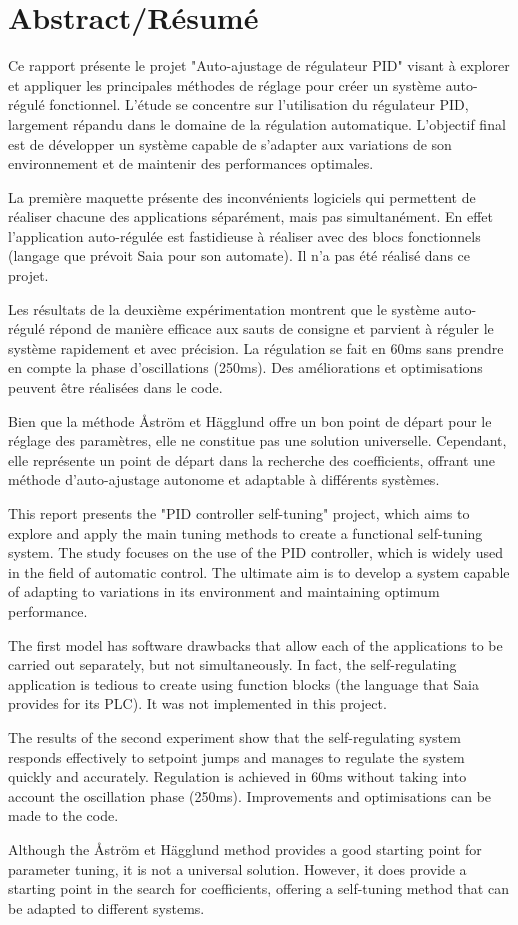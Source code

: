\part*{Abstract/Résumé}


Ce rapport présente le projet "Auto-ajustage de régulateur PID" visant à explorer et appliquer les principales méthodes de réglage pour créer un système auto-régulé fonctionnel. L'étude se concentre sur l'utilisation du régulateur PID, largement répandu dans le domaine de la régulation automatique. L'objectif final est de développer un système capable de s'adapter aux variations de son environnement et de maintenir des performances optimales.

La première maquette présente des inconvénients logiciels qui permettent de réaliser chacune des applications séparément, mais pas simultanément. En effet l'application auto-régulée est fastidieuse à réaliser avec des blocs fonctionnels (langage que prévoit Saia pour son automate). Il n'a pas été réalisé dans ce projet.

Les résultats de la deuxième expérimentation montrent que le système auto-régulé répond de manière efficace aux sauts de consigne et parvient à réguler le système rapidement et avec précision. La régulation se fait en 60ms sans prendre en compte la phase d'oscillations (250ms). Des améliorations et optimisations peuvent être réalisées dans le code.

Bien que la méthode Åström et Hägglund offre un bon point de départ pour le réglage des paramètres, elle ne constitue pas une solution universelle. Cependant, elle représente un point de départ dans la recherche des coefficients, offrant une méthode d'auto-ajustage autonome et adaptable à différents systèmes.

\vspace{1cm}
This report presents the "PID controller self-tuning" project, which aims to explore and apply the main tuning methods to create a functional self-tuning system. The study focuses on the use of the PID controller, which is widely used in the field of automatic control. The ultimate aim is to develop a system capable of adapting to variations in its environment and maintaining optimum performance.

The first model has software drawbacks that allow each of the applications to be carried out separately, but not simultaneously. In fact, the self-regulating application is tedious to create using function blocks (the language that Saia provides for its PLC). It was not implemented in this project.

The results of the second experiment show that the self-regulating system responds effectively to setpoint jumps and manages to regulate the system quickly and accurately. Regulation is achieved in 60ms without taking into account the oscillation phase (250ms). Improvements and optimisations can be made to the code.

Although the Åström et Hägglund method provides a good starting point for parameter tuning, it is not a universal solution. However, it does provide a starting point in the search for coefficients, offering a self-tuning method that can be adapted to different systems.

